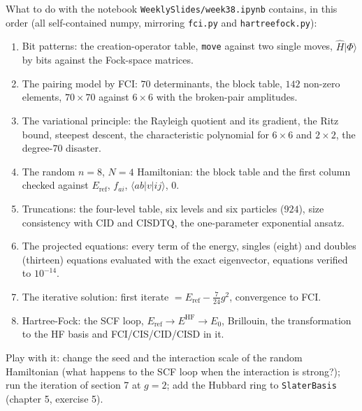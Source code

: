 \documentclass[aspectratio=169,10pt]{beamer}
\newcommand{\ket}[1]{\vert #1\rangle}
\newcommand{\element}[3]{\langle #1\vert #2\vert #3\rangle}
\begin{document}
\begin{frame}{What to do with the notebook}
  \footnotesize
  \texttt{WeeklySlides/week38.ipynb} contains, in this order (all self-contained numpy, mirroring \texttt{fci.py} and \texttt{hartreefock.py}):
  \begin{enumerate}
    \item Bit patterns: the creation-operator table, \texttt{move} against two single moves, $\hat{H}\ket{\Phi}$ by bits against the Fock-space matrices.
    \item The pairing model by FCI: $70$ determinants, the block table, $142$ non-zero elements, $70\times70$ against $6\times6$ with the broken-pair amplitudes.
    \item The variational principle: the Rayleigh quotient and its gradient, the Ritz bound, steepest descent, the characteristic polynomial for $6\times6$ and $2\times2$, the degree-$70$ disaster.
    \item The random $n=8$, $N=4$ Hamiltonian: the block table and the first column checked against $E_{\mathrm{ref}}$, $f_{ai}$, $\element{ab}{v}{ij}$, $0$.
    \item Truncations: the four-level table, six levels and six particles ($924$), size consistency with CID and CISDTQ, the one-parameter exponential ansatz.
    \item The projected equations: every term of the energy, singles (eight) and doubles (thirteen) equations evaluated with the exact eigenvector, equations verified to $10^{-14}$.
    \item The iterative solution: first iterate $=E_{\mathrm{ref}}-\frac{7}{24}g^2$, convergence to FCI.
    \item Hartree-Fock: the SCF loop, $E_{\mathrm{ref}}\to E^{\mathrm{HF}}\to E_0$, Brillouin, the transformation to the HF basis and FCI/CIS/CID/CISD in it.
  \end{enumerate}
  Play with it: change the seed and the interaction scale of the random Hamiltonian (what happens to the SCF loop when the interaction is strong?); run the iteration of section 7 at $g=2$; add the Hubbard ring to \texttt{SlaterBasis} (chapter 5, exercise 5).
\end{frame}
\end{document}
